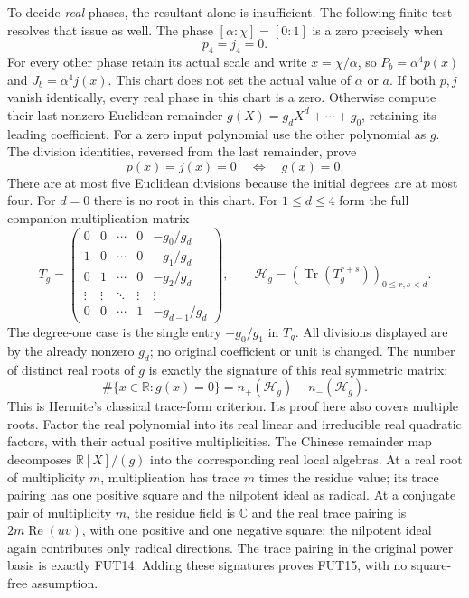 \documentclass[11pt]{article}
\begin{document}
To decide \emph{real} phases, the resultant alone is insufficient.
The following finite test resolves that issue as well. The phase
$[\alpha:\chi]=[0:1]$ is a zero precisely when
\[
                         p_4=j_4=0.
 \tag{FUT12}
\]
For every other phase retain its actual scale and write
$x=\chi/\alpha$, so $P_b=\alpha^4p(x)$ and
$J_b=\alpha^4j(x)$. This chart does not set the actual value of
$\alpha$ or $a$. If both $p,j$ vanish identically, every real phase
in this chart is a zero. Otherwise compute their last nonzero Euclidean
remainder $g(X)=g_dX^d+\cdots+g_0$, retaining its leading coefficient.
For a zero input polynomial use the other polynomial as $g$.
The division identities, reversed from the last remainder, prove
\[
             p(x)=j(x)=0\quad\Longleftrightarrow\quad g(x)=0.
 \tag{FUT13}
\]
There are at most five Euclidean divisions because the initial degrees
are at most four. For $d=0$ there is no root in this chart.
For $1\le d\le4$ form the full companion multiplication matrix
\[
 T_g=\begin{pmatrix}
 0&0&\cdots&0&-g_0/g_d\\
 1&0&\cdots&0&-g_1/g_d\\
 0&1&\cdots&0&-g_2/g_d\\
 \vdots&\vdots&\ddots&\vdots&\vdots\\
 0&0&\cdots&1&-g_{d-1}/g_d
 \end{pmatrix},\qquad
 \mathcal H_g=(\operatorname{Tr}(T_g^{r+s}))_{0\le r,s<d}.
 \tag{FUT14}
\]
The degree-one case is the single entry $-g_0/g_1$ in $T_g$.
All divisions displayed are by the already nonzero $g_d$; no original
coefficient or unit is changed. The number of distinct real roots of
$g$ is exactly the signature of this real symmetric matrix:
\[
   \#\{x\in\mathbb R:g(x)=0\}
          =n_+(\mathcal H_g)-n_-(\mathcal H_g).
 \tag{FUT15}
\]
This is Hermite's classical trace-form criterion. Its proof here also
covers multiple roots. Factor the real polynomial into its real linear
and irreducible real quadratic factors, with their actual positive
multiplicities. The Chinese remainder map decomposes
$\mathbb R[X]/(g)$ into the corresponding real local algebras.
At a real root of multiplicity $m$, multiplication has trace $m$
times the residue value; its trace pairing has one positive square
and the nilpotent ideal as radical. At a conjugate pair of multiplicity
$m$, the residue field is $\mathbb C$ and the real trace pairing is
$2m\operatorname{Re}(uv)$, with one positive and one negative square;
the nilpotent ideal again contributes only radical directions.
The trace pairing in the original power basis is exactly FUT14.
Adding these signatures proves FUT15, with no square-free assumption.
\end{document}
